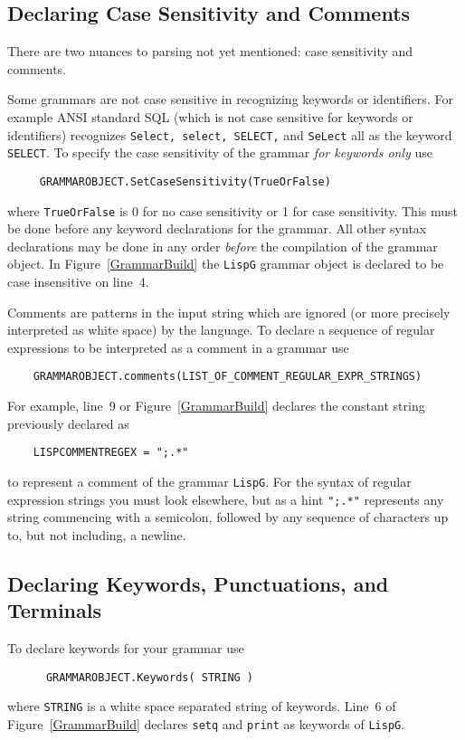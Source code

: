 \subsection{Declaring Case Sensitivity and Comments}

There are two nuances to parsing not yet mentioned:
case sensitivity and comments.  

Some grammars are not
case sensitive in recognizing keywords or identifiers.
For example ANSI standard SQL (which is not
case sensitive for keywords or identifiers) recognizes
{\tt Select, select, SELECT,} and {\tt SeLect} all 
as the keyword {\tt SELECT}.
To specify the case sensitivity of the grammar {\em
for keywords only} use
\begin{verbatim}
     GRAMMAROBJECT.SetCaseSensitivity(TrueOrFalse) 
\end{verbatim}
where {\tt TrueOrFalse} is 0 for no case sensitivity or
1 for case sensitivity.  This {\sc must} be done before
any keyword declarations for the grammar.  All other
syntax declarations may be done in any order {\em before}
the compilation of the grammar object.
In Figure~\ref{GrammarBuild} the {\tt LispG} grammar object
is declared to be case insensitive on line~4.

Comments are patterns in the input string which are ignored
(or more precisely interpreted as white space) by the language.
To declare a sequence of regular expressions to be interpreted as a comment
in a grammar use
\begin{verbatim}
    GRAMMAROBJECT.comments(LIST_OF_COMMENT_REGULAR_EXPR_STRINGS)
\end{verbatim}
For example, line~9 or Figure~\ref{GrammarBuild} declares
the constant string previously declared as
\begin{verbatim}
    LISPCOMMENTREGEX = ";.*"
\end{verbatim}
to represent a comment of the grammar {\tt LispG}.
For the syntax of regular expression strings you must look
elsewhere, but as a hint {\tt ";.*"} represents any string
commencing with a semicolon, followed by any sequence of
characters up to, but not including, a newline.

\subsection{Declaring Keywords, Punctuations, and Terminals}

To declare keywords for your grammar use
\begin{verbatim}
      GRAMMAROBJECT.Keywords( STRING )
\end{verbatim}
where {\tt STRING} is a white space separated string of keywords.
Line~6 of Figure~\ref{GrammarBuild} declares {\tt setq} and {\tt print}
as keywords of {\tt LispG}.

